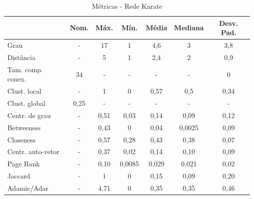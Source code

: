 \documentclass[12pt,a4paper]{article}
\begin{document}
	\begin{table}[H]
		\caption{Métricas - Rede Karate}
		\label{tab:karete}
		\centering
		\begin{tabular}{l|c|c|c|c|c|c}
			& \textbf{Nom.} & \textbf{Máx.} & \textbf{Mín.} & \textbf{Média} & \textbf{Mediana} & \textbf{Desv. Pad.} \\ \hline
			Grau              & -                                 & 17            & 1             & 4,6             & 3                & 3,8                \\ \hline
			Distância         & -                                 & 5             & 1             & 2,4             & 2                & 0,9                \\ \hline
			Tam. comp. conex.  & 34                                 & -            & -           & -              & -               & 0                  \\ \hline
			Clust. local      & -                                 & 1             & 0             & 0,57            & 0,5              & 0,34               \\ \hline
			Clust. global     & 0,25                              & -             & -             & -               & -                & -                  \\ \hline
			Centr. de grau    & -                                 & 0,51          & 0,03          & 0,14            & 0,09             & 0,12               \\ \hline
			Betweeness        & -                                 & 0,43          & 0             & 0,04            & 0,0025           & 0,09               \\ \hline
			Closeness         & -                                 & 0,57          & 0,28          & 0,43            & 0,38             & 0,07               \\ \hline
			Centr. auto-vetor & -                                 & 0,37          & 0,02          & 0,14            & 0,10             & 0,09               \\ \hline
			Page Rank         & -                                 & 0,10          & 0,0085        & 0,029           & 0,021            & 0,02               \\ \hline
			Jaccard           & -                                 & 1             & 0             & 0,15            & 0,09             & 0,20               \\ \hline
			Adamic/Adar       & -                                 & 4,71          & 0             & 0,35            & 0,35             & 0,46
			           
		\end{tabular}
	\end{table}
	
\end{document}

